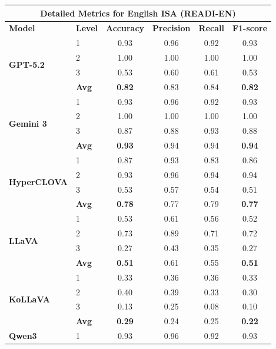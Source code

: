 \documentclass[11pt]{article}
\begin{document}
\begin{center}
    \small
    \begin{tabular}{llcccc}
        \toprule
        \multicolumn{6}{c}{\textbf{Detailed Metrics for English ISA (READI-EN)}} \\
        \toprule
        \textbf{Model} & \textbf{Level} & \textbf{Accuracy} & \textbf{Precision} & \textbf{Recall} & \textbf{F1-score} \\
        \midrule
        \multirow{4}{*}{\textbf{GPT-5.2}} & 1 & 0.93 & 0.96 & 0.92 & 0.93 \\
        & 2 & 1.00 & 1.00 & 1.00 & 1.00 \\
        & 3 & 0.53 & 0.60 & 0.61 & 0.53 \\
        & \textbf{Avg} & \textbf{0.82} & 0.83 & 0.84 & \textbf{0.82} \\
        \midrule
        \multirow{4}{*}{\textbf{Gemini 3}} & 1 & 0.93 & 0.96 & 0.92 & 0.93 \\
        & 2 & 1.00 & 1.00 & 1.00 & 1.00 \\
        & 3 & 0.87 & 0.88 & 0.93 & 0.88 \\
        & \textbf{Avg} & \textbf{0.93} & 0.94 & 0.94 & \textbf{0.94} \\
        \midrule
        \multirow{4}{*}{\textbf{HyperCLOVA}} & 1 & 0.87 & 0.93 & 0.83 & 0.86 \\
        & 2 & 0.93 & 0.96 & 0.94 & 0.94 \\
        & 3 & 0.53 & 0.57 & 0.54 & 0.51 \\
        & \textbf{Avg} & \textbf{0.78} & 0.77 & 0.79 & \textbf{0.77} \\
        \midrule
        \multirow{4}{*}{\textbf{LLaVA}} & 1 & 0.53 & 0.61 & 0.56 & 0.52 \\
        & 2 & 0.73 & 0.89 & 0.71 & 0.72 \\
        & 3 & 0.27 & 0.43 & 0.35 & 0.27 \\
        & \textbf{Avg} & \textbf{0.51} & 0.61 & 0.55 & \textbf{0.51} \\
        \midrule
        \multirow{4}{*}{\textbf{KoLLaVA}} & 1 & 0.33 & 0.36 & 0.36 & 0.33 \\
        & 2 & 0.40 & 0.39 & 0.33 & 0.30 \\
        & 3 & 0.13 & 0.25 & 0.08 & 0.10 \\
        & \textbf{Avg} & \textbf{0.29} & 0.24 & 0.25 & \textbf{0.22} \\
        \midrule
        \multirow{4}{*}{\textbf{Qwen3}} & 1 & 0.93 & 0.96 & 0.92 & 0.93 \\

\end{tabular}
\end{center}
\end{document}
